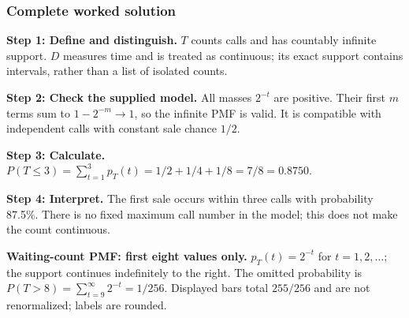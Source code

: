 \subsubsection*{Complete worked solution}
\par\noindent\begin{minipage}{\linewidth}
\textbf{Step 1: Define and distinguish.} $T$ counts calls and has countably infinite support. $D$ measures time and is treated as continuous; its exact support contains intervals, rather than a list of isolated counts.
\end{minipage}\par\medskip
\par\noindent\begin{minipage}{\linewidth}
\textbf{Step 2: Check the supplied model.} All masses $2^{-t}$ are positive. Their first $m$ terms sum to $1-2^{-m}\to1$, so the infinite PMF is valid. It is compatible with independent calls with constant sale chance $1/2$.
\end{minipage}\par\medskip
\par\noindent\begin{minipage}{\linewidth}
\textbf{Step 3: Calculate.} $P(T\leq3)=\sum_{t=1}^{3}p_T(t)=1/2+1/4+1/8=7/8=0.8750$.
\end{minipage}\par\medskip
\par\noindent\begin{minipage}{\linewidth}
\textbf{Step 4: Interpret.} The first sale occurs within three calls with probability 87.5\%. There is no fixed maximum call number in the model; this does not make the count continuous.
\end{minipage}\par\medskip
\par\noindent \begin{minipage}[t]{.98\linewidth}
\centering
{}
\par\small \textbf{Waiting-count PMF: first eight values only.} $p_T(t)=2^{-t}$ for $t=1,2,\ldots$; the support continues indefinitely to the right. The omitted probability is $P(T>8)=\sum_{t=9}^{\infty}2^{-t}=1/256$. Displayed bars total $255/256$ and are not renormalized; labels are rounded.
\end{minipage}\par\medskip


